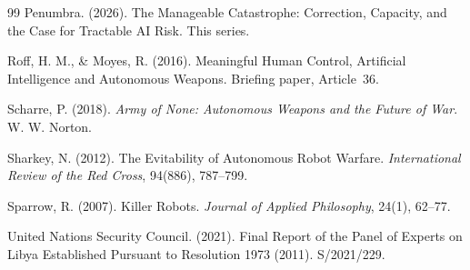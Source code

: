 \documentclass[11pt]{article}
\begin{document}
\begin{thebibliography}{99}
Penumbra. (2026). The Manageable Catastrophe: Correction, Capacity, and the Case for Tractable AI Risk. This series.

Roff, H. M., \& Moyes, R. (2016). Meaningful Human Control, Artificial Intelligence and Autonomous Weapons. Briefing paper, Article~36.

Scharre, P. (2018). \textit{Army of None: Autonomous Weapons and the Future of War}. W. W. Norton.

Sharkey, N. (2012). The Evitability of Autonomous Robot Warfare. \textit{International Review of the Red Cross}, 94(886), 787--799.

Sparrow, R. (2007). Killer Robots. \textit{Journal of Applied Philosophy}, 24(1), 62--77.

United Nations Security Council. (2021). Final Report of the Panel of Experts on Libya Established Pursuant to Resolution 1973 (2011). S/2021/229.

\end{thebibliography}
\end{document}
